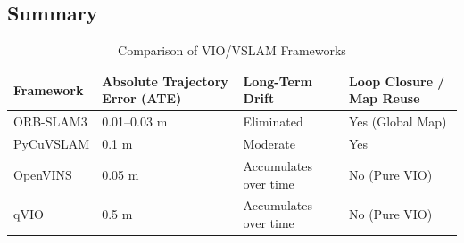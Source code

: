 \subsection{Summary}
\begin{table}[H]
\centering
\caption{Comparison of VIO/VSLAM Frameworks}
\label{tab:vio_vslam_summary}
\begin{tabular}{|p{2.6cm}|p{3.6cm}|p{3.4cm}|p{3.8cm}|}
\hline
\textbf{Framework} & \textbf{Absolute Trajectory Error (ATE)} & \textbf{Long-Term Drift} & \textbf{Loop Closure / Map Reuse} \\
\hline
ORB-SLAM3 & 0.01--0.03 m & Eliminated & Yes (Global Map) \\
\hline
PyCuVSLAM & 0.1 m & Moderate & Yes \\
\hline
OpenVINS & 0.05 m & Accumulates over time & No (Pure VIO) \\
\hline
qVIO & 0.5 m & Accumulates over time & No (Pure VIO) \\
\hline
\end{tabular}
\end{table}